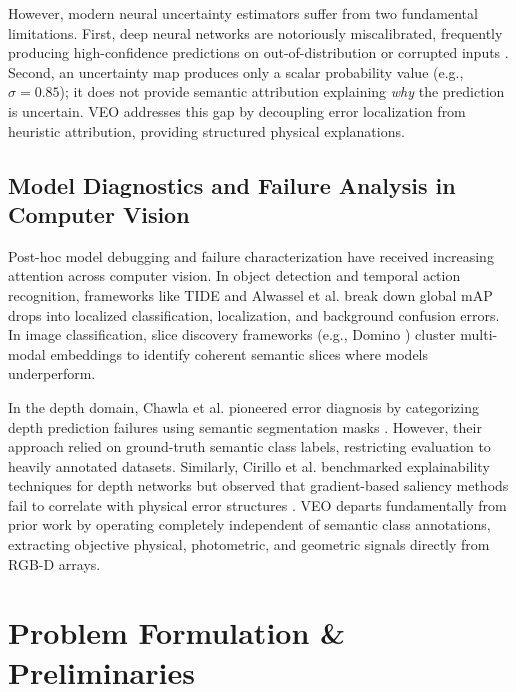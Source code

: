 \documentclass[11pt,a4paper]{article}
\begin{document}
However, modern neural uncertainty estimators suffer from two fundamental limitations. First, deep neural networks are notoriously miscalibrated, frequently producing high-confidence predictions on out-of-distribution or corrupted inputs \citep{guo2017calibration,ovadia2019can}. Second, an uncertainty map produces only a scalar probability value (e.g., $\sigma = 0.85$); it does not provide semantic attribution explaining \textit{why} the prediction is uncertain. VEO addresses this gap by decoupling error localization from heuristic attribution, providing structured physical explanations.

\subsection{Model Diagnostics and Failure Analysis in Computer Vision}
Post-hoc model debugging and failure characterization have received increasing attention across computer vision. In object detection and temporal action recognition, frameworks like TIDE \citep{bolya2020tide} and Alwassel et al. \citep{alwassel2018diagnosing} break down global mAP drops into localized classification, localization, and background confusion errors. In image classification, slice discovery frameworks (e.g., Domino \citep{eyuboglu2022domino}) cluster multi-modal embeddings to identify coherent semantic slices where models underperform.

In the depth domain, Chawla et al. pioneered error diagnosis by categorizing depth prediction failures using semantic segmentation masks \citep{chawla2021error}. However, their approach relied on ground-truth semantic class labels, restricting evaluation to heavily annotated datasets. Similarly, Cirillo et al. benchmarked explainability techniques for depth networks but observed that gradient-based saliency methods fail to correlate with physical error structures \citep{cirillo2025shedding}. VEO departs fundamentally from prior work by operating completely independent of semantic class annotations, extracting objective physical, photometric, and geometric signals directly from RGB-D arrays.

\section{Problem Formulation \& Preliminaries}
\label{sec:formulation}
\end{document}
